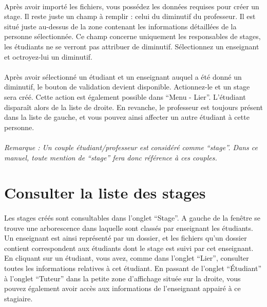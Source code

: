 \documentclass[a4paper,10pt]{book}
\begin{document}
	\paragraph{}
	  Après avoir importé les fichiers, vous possédez les données requises pour créer un stage.
	  Il reste juste un champ à remplir : celui du diminutif du professeur. 
	  Il est situé juste au-dessus de la zone contenant les informations détaillées de la personne sélectionnée.
	  Ce champ concerne uniquement les responsables de stages, les étudiants ne se verront pas attribuer de diminutif.
	  Sélectionnez un enseignant et octroyez-lui un diminutif.
	  
	
	\paragraph{}
	  Après avoir sélectionné un étudiant et un enseignant auquel a été donné un diminutif, le bouton de validation devient disponible.
	  Actionnez-le et un stage sera créé.
	  Cette action est également possible dans ``Menu - Lier''.
	  L'étudiant disparaît alors de la liste de droite.
	  En revanche, le professeur est toujours présent dans la liste de gauche, et vous pouvez ainsi affecter un autre étudiant à cette personne.
	  
	\paragraph{}
	  \textit{Remarque : Un couple étudiant/professeur est considéré comme ``stage''. Dans ce manuel, toute mention de ``stage'' fera donc référence à ces couples.}
	  
    \section{Consulter la liste des stages}
      \paragraph{}
	Les stages créés sont consultables dans l'onglet ``Stage''.
	A gauche de la fenêtre se trouve une arborescence dans laquelle sont classés par enseignant les étudiants. 
	Un enseignant est ainsi représenté par un dossier, et les fichiers qu'un dossier contient correspondent aux étudiants dont le stage est suivi par cet enseignant.
	En cliquant sur un étudiant, vous avez, comme dans l'onglet ``Lier'', consulter toutes les informations relatives à cet étudiant. 
	En passant de l'onglet ``Étudiant'' à l'onglet ``Tuteur'' dans la petite zone d'affichage située sur la droite, vous pouvez également avoir accès aux informations de l'enseignant appairé à ce stagiaire.
	
\end{document}
